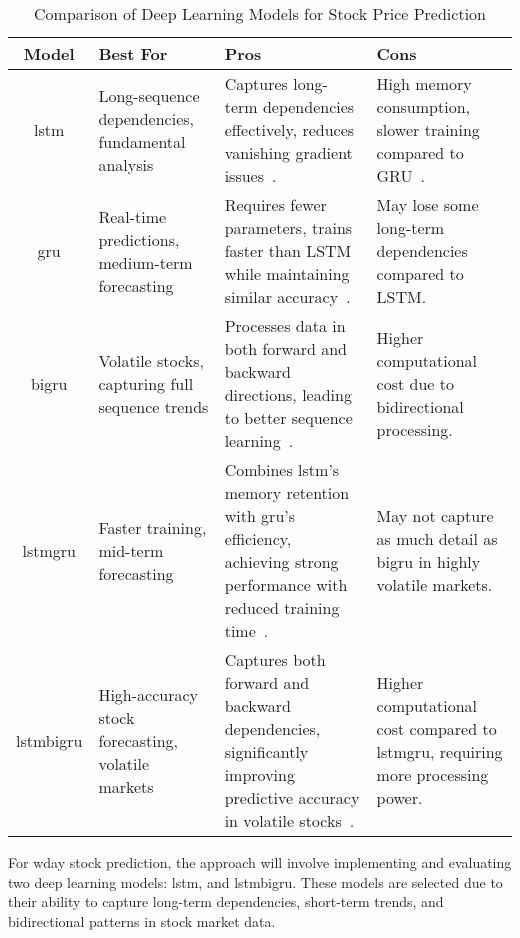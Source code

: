 \begin{table}[H]
    \centering
    \caption{Comparison of Deep Learning Models for Stock Price Prediction}
    \label{tab:stock_models}
    \begin{tabular}{cp{4cm}p{4cm}p{4cm}}
        \hline
        \textbf{Model} & \textbf{Best For} & \textbf{Pros} & \textbf{Cons} \\
        \hline
        \acrshort{lstm} & Long-sequence dependencies, fundamental analysis & Captures
        long-term dependencies effectively, reduces vanishing gradient
        issues~\parencite{shaban2024SMPDL}. & High memory consumption, slower training 
        compared to GRU~\parencite{chang2024StockPrediction}. \\
        \acrshort{gru} & Real-time predictions, medium-term forecasting & Requires 
        fewer parameters, trains faster than LSTM while maintaining similar
        accuracy~\parencite{guo2024LSTMStock}. & May lose some long-term dependencies 
        compared to LSTM. \\
        \acrshort{bigru} & Volatile stocks, capturing full sequence trends & Processes 
        data in both forward and backward directions, leading to better sequence
        learning~\parencite{shaban2024SMPDL}. & Higher computational cost due to 
        bidirectional processing. \\
        \acrshort{lstmgru} & Faster training, mid-term forecasting & 
        Combines \acrshort{lstm}'s memory retention with \acrshort{gru}’s efficiency,
        achieving strong performance with reduced training 
        time~\parencite{chang2024StockPrediction}. & May not capture as much detail as 
        \acrshort{bigru} in highly volatile markets. \\
        \acrshort{lstmbigru} & High-accuracy stock forecasting, volatile markets & 
        Captures both forward and backward dependencies, significantly improving 
        predictive accuracy in volatile stocks~\parencite{shaban2024SMPDL}. & 
        Higher computational cost compared to \acrshort{lstmgru}, requiring more 
        processing power. \\ \hline
    \end{tabular}
\end{table}

For \acrshort{wday} stock prediction, the approach will involve implementing and evaluating 
two deep learning models: \acrshort{lstm}, and \acrshort{lstmbigru}.
These models are selected due to their ability to capture long-term dependencies, 
short-term trends, and bidirectional patterns in stock market data.

